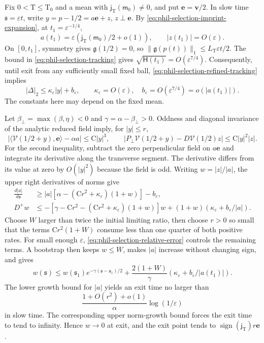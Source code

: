 Fix \(0<\mathrm T\le\mathrm T_0\) and a mean with
\(\mathsf j_{\mathrm T}(\mathsf m_0)\ne0\), and put
\(\mathbf e=\mathbf v/2\). In slow time
\(\mathfrak s=\varepsilon t\), write
\(y=p-1/2=a\mathbf e+z\), \(z\perp\mathbf e\).
By \cref{eq:phil-selection-imprint-expansion}, at
\(t_1=\varepsilon^{-1/4}\),
\[
 a(t_1)=\varepsilon(\mathsf j_{\mathrm T}(\mathsf m_0)/2+o(1)),
 \qquad |z(t_1)|=O(\varepsilon).
\]
On \([0,t_1]\), symmetry gives \(\mathfrak g(1/2)=0\), so
\(\|\mathfrak g(p(t))\|_1\le L_{\mathrm T}\varepsilon t/2\).
The bound in \cref{eq:phil-selection-tracking} gives
\(\sqrt{\mathsf H(t_1)}=O(\varepsilon^{7/4})\).
Consequently, until exit from any sufficiently small fixed ball,
\cref{eq:phil-selection-refined-tracking} implies
\begin{equation}
 |\Delta|_2\le\kappa_\varepsilon|y|+b_\varepsilon,
 \qquad \kappa_\varepsilon=O(\varepsilon),\quad
 b_\varepsilon=O(\varepsilon^{7/4})=o(|a(t_1)|).
\label{eq:phil-selection-relative-error}
\end{equation}
The constants here may depend on the fixed mean.

Let \(\beta_\perp=\max(\beta,\eta)<0\) and
\(\gamma=\alpha-\beta_\perp>0\).
Oddness and diagonal invariance of the analytic reduced field imply,
for \(|y|\le r\),
\[
 |\langle\mathscr V(1/2+y),\mathbf e\rangle-\alpha a|
       \le\mathrm C|y|^3,\qquad
 |P_\perp\mathscr V(1/2+y)-D\mathscr V(1/2)z|
       \le\mathrm C|y|^2|z|.
\]
For the second inequality, subtract the zero perpendicular field on
\(a\mathbf e\) and integrate its derivative along the transverse
segment. The derivative differs from its value at zero by
\(O(|y|^2)\) because the field is odd.
Writing \(w=|z|/|a|\), the upper right derivatives of norms give
\begin{equation}
 \begin{aligned}
 \frac{d|a|}{d\mathfrak s}
 &\ge |a|[\alpha-(\mathrm Cr^2+\kappa_\varepsilon)(1+w)]
                -b_\varepsilon,\\
 D^+w
 &\le-[\gamma-\mathrm Cr^2
             -(\mathrm Cr^2+\kappa_\varepsilon)(1+w)]w
        +(1+w)(\kappa_\varepsilon+b_\varepsilon/|a|).
 \end{aligned}
\label{eq:phil-selection-cone}
\end{equation}
Choose \(W\) larger than twice the initial limiting ratio, then choose
\(r>0\) so small that the terms \(\mathrm Cr^2(1+W)\) consume less than
one quarter of both positive rates. For small enough \(\varepsilon\),
\cref{eq:phil-selection-relative-error} controls the remaining terms.
A bootstrap then keeps \(w\le W\), makes \(|a|\) increase without changing
sign, and gives
\[
 w(\mathfrak s)
 \le w(\mathfrak s_1)e^{-\gamma(\mathfrak s-\mathfrak s_1)/2}
  +\frac{2(1+W)}\gamma
       (\kappa_\varepsilon+b_\varepsilon/|a(t_1)|).
\]
The lower growth bound for \(|a|\) yields an exit time no larger than
\[
 \frac{1+O(r^2)+o(1)}\alpha\log(1/\varepsilon)
\]
in slow time. The corresponding upper norm-growth bound forces the exit
time to tend to infinity. Hence \(w\to0\) at exit, and the exit point
tends to \(\operatorname{sign}(\mathsf j_{\mathrm T})r\mathbf e\).

